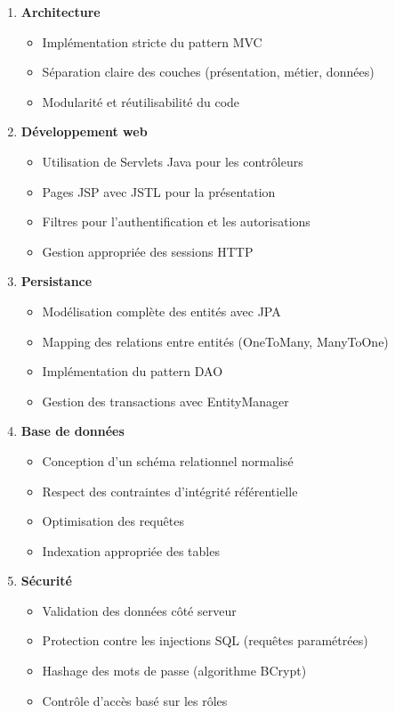 \documentclass[12pt,a4paper]{report}
\begin{document}
\begin{enumerate}
    \item \textbf{Architecture}
    \begin{itemize}
        \item Implémentation stricte du pattern MVC
        \item Séparation claire des couches (présentation, métier, données)
        \item Modularité et réutilisabilité du code
    \end{itemize}
    
    \item \textbf{Développement web}
    \begin{itemize}
        \item Utilisation de Servlets Java pour les contrôleurs
        \item Pages JSP avec JSTL pour la présentation
        \item Filtres pour l'authentification et les autorisations
        \item Gestion appropriée des sessions HTTP
    \end{itemize}
    
    \item \textbf{Persistance}
    \begin{itemize}
        \item Modélisation complète des entités avec JPA
        \item Mapping des relations entre entités (OneToMany, ManyToOne)
        \item Implémentation du pattern DAO
        \item Gestion des transactions avec EntityManager
    \end{itemize}
    
    \item \textbf{Base de données}
    \begin{itemize}
        \item Conception d'un schéma relationnel normalisé
        \item Respect des contraintes d'intégrité référentielle
        \item Optimisation des requêtes
        \item Indexation appropriée des tables
    \end{itemize}
    
    \item \textbf{Sécurité}
    \begin{itemize}
        \item Validation des données côté serveur
        \item Protection contre les injections SQL (requêtes paramétrées)
        \item Hashage des mots de passe (algorithme BCrypt)
        \item Contrôle d'accès basé sur les rôles
    \end{itemize}
    

\end{enumerate}
\end{document}

